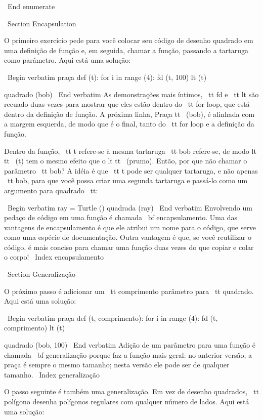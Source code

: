 \documentclass[10pt]{book}
\begin{document}
{\ End {enumerate}

\ Section {} Encapsulation

O primeiro exercício pede para você colocar seu código de desenho quadrado
em uma definição de função e, em seguida, chamar a função, passando
a tartaruga como parâmetro. Aqui está uma solução:

\ Begin {verbatim}
praça def (t):
    for i in range (4):
        fd (t, 100)
        lt (t)

quadrado (bob)
\ End {verbatim}
%
As demonstrações mais íntimos, {\ tt fd} e {\ tt lt} são
recuado duas vezes para mostrar que eles estão dentro do {\ tt for} loop,
que está dentro da definição de função. A próxima linha,
{Praça tt \ (bob)}, é alinhada com a margem esquerda, de modo que é o
final, tanto do {\ tt for} loop e a definição da função.

Dentro da função, {\ tt t} refere-se à mesma tartaruga {\ tt bob}
refere-se, de modo {lt tt \ (t)} tem o mesmo efeito que o {lt tt \ (prumo)}.
Então, por que não chamar o parâmetro {\ tt bob}? A idéia é que {\ tt t}
pode ser qualquer tartaruga, e não apenas {\ tt bob}, para que você possa criar
uma segunda tartaruga e passá-lo como um argumento para {quadrado \ tt}:

\ Begin {verbatim}
ray = Turtle ()
quadrada (ray)
\ End {verbatim}
%
Envolvendo um pedaço de código em uma função é chamada {\ bf
encapsulamento}. Uma das vantagens de encapsulamento é que ele
atribui um nome para o código, que serve como uma espécie de documentação.
Outra vantagem é que, se você reutilizar o código, é mais conciso
para chamar uma função duas vezes do que copiar e colar o corpo!
\ Index {} encapsulamento


\ Section {} Generalização

O próximo passo é adicionar um {\ tt comprimento} parâmetro para {\ tt quadrado}.
Aqui está uma solução:

\ Begin {verbatim}
praça def (t, comprimento):
    for i in range (4):
        fd (t, comprimento)
        lt (t)

quadrado (bob, 100)
\ End {verbatim}
%
Adição de um parâmetro para uma função é chamada {\ bf generalização}
porque faz a função mais geral: no anterior
versão, a praça é sempre o mesmo tamanho; nesta versão
ele pode ser de qualquer tamanho.
\ Index {generalização}

O passo seguinte é também uma generalização. Em vez de desenho
quadrados, {\ tt polígono} desenha polígonos regulares com qualquer número de
lados. Aqui está uma solução:

}
\end{document}
